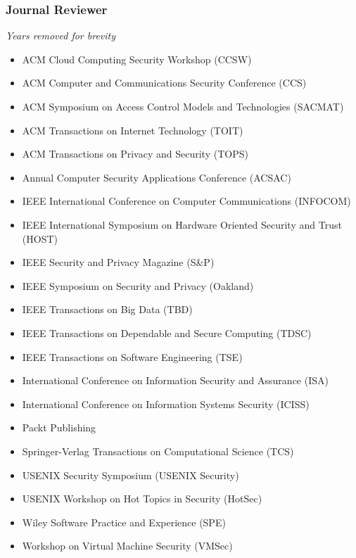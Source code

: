 \hypertarget{journal-reviews}{%
\subsubsection{Journal Reviewer}\label{journal-reviews}}
\small{\textit{Years removed for brevity}}
\begin{itemize}
\tightlist
\item ACM Cloud Computing Security Workshop (CCSW)
\item ACM Computer and Communications Security Conference (CCS)
\item ACM Symposium on Access Control Models and Technologies (SACMAT)
\item ACM Transactions on Internet Technology (TOIT)
\item ACM Transactions on Privacy and Security (TOPS)
\item Annual Computer Security Applications Conference (ACSAC)
\item IEEE International Conference on Computer Communications (INFOCOM)
\item IEEE International Symposium on Hardware Oriented Security and Trust (HOST)
\item IEEE Security and Privacy Magazine (S\&P)
\item IEEE Symposium on Security and Privacy (Oakland)
\item IEEE Transactions on Big Data (TBD)
\item IEEE Transactions on Dependable and Secure Computing (TDSC)
\item IEEE Transactions on Software Engineering (TSE)
\item International Conference on Information Security and Assurance (ISA)
\item International Conference on Information Systems Security (ICISS)
\item Packt Publishing
\item Springer-Verlag Transactions on Computational Science (TCS)
\item USENIX Security Symposium (USENIX Security)
\item USENIX Workshop on Hot Topics in Security (HotSec)
\item Wiley Software Practice and Experience (SPE)
\item Workshop on Virtual Machine Security (VMSec)
\end{itemize}

